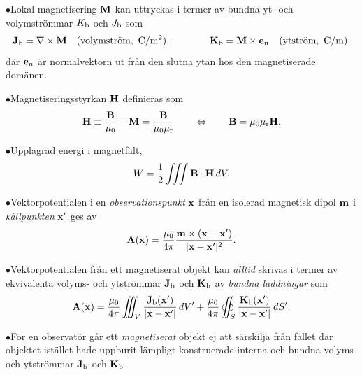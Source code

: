 {{{{{\item{$\bullet$}{Lokal magnetisering ${\bf M}$ kan uttryckas i termer av
  bundna yt- och volymstr{\"o}mmar $K_{\rm b}$ och $J_{\rm b}$ som
  $$
    {\bf J}_{\rm b}=\nabla\times{\bf M}
                   \quad(\hbox{volymstr{\"o}m},\ {\rm C}/{\rm m}^2),\qquad\qquad
    {\bf K}_{\rm b}={\bf M}\times{\bf e}_n
                   \quad(\hbox{ytstr{\"o}m},\ {\rm C}/{\rm m}).
  $$
  d{\"a}r ${\bf e}_n$ {\"a}r normalvektorn ut fr{\aa}n den slutna ytan hos den
  magnetiserade dom{\"a}nen.}
\item{$\bullet$}{Magnetiseringsstyrkan ${\bf H}$ definieras som
  $$
    {\bf H}\equiv{{\bf B}\over{\mu_0}}-{\bf M}={{\bf B}\over{\mu_0\mu_{\rm r}}}
    \qquad\Leftrightarrow\qquad
    {\bf B}=\mu_0\mu_{\rm r}{\bf H}.
  $$}
\item{$\bullet$}{Upplagrad energi i magnetf{\"a}lt,
  $$
    W = {{1}\over{2}}\iiint{\bf B}\cdot{\bf H}\,dV.
  $$}
\item{$\bullet$}{Vektorpotentialen i en {\it observationspunkt} ${\bf x}$
  fr{\aa}n en isolerad magnetisk dipol ${\bf m}$ i {\it k{\"a}llpunkten}
  ${\bf x}'$ ges av
  $$
    {\bf A}({\bf x})={{\mu_0}\over{4\pi}}
      {{{\bf m}\times({\bf x}-{\bf x}')}\over{|{\bf x}-{\bf x}'|^2}}.
  $$}
\item{$\bullet$}{Vektorpotentialen fr{\aa}n ett magnetiserat objekt kan
  {\it alltid} skrivas i termer av ekvivalenta volyms- och ytstr{\"o}mmar
  ${\bf J}_{\rm b}$ och ${\bf K}_{\rm b}$ av {\it bundna laddningar} som
  $$
    {\bf A}({\bf x}) = {{\mu_0}\over{4\pi}}\iiint_V
      {{{\bf J}_{\rm b}({\bf x}')}\over{|{\bf x}-{\bf x}'|}}\,dV'
    +{{\mu_0}\over{4\pi}}\oiint_S
      {{{\bf K}_{\rm b}({\bf x}')}\over{|{\bf x}-{\bf x}'|}}\,dS'.
  $$}
\item{$\bullet$}{F{\"o}r en observat{\"o}r g{\aa}r ett {\it magnetiserat}
  objekt ej att s{\"a}rskilja fr{\aa}n fallet d{\"a}r objektet ist{\"a}llet
  hade uppburit l{\"a}mpligt konstruerade interna och bundna volyms- och
  ytstr{\"o}mmar ${\bf J}_{\rm b}$ och ${\bf K}_{\rm b}$.}

}}}}}
